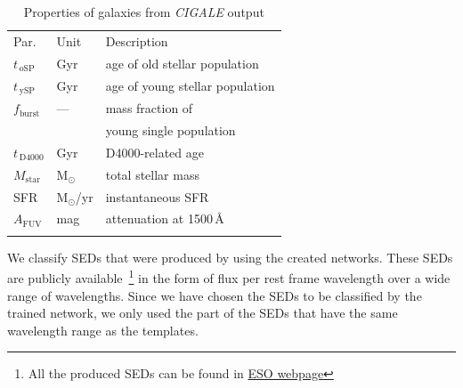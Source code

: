        
    \begin{table}
\caption{Properties of  galaxies from {\em CIGALE} output }     %
\label{tab: props}
\centering
\begin{tabular}{l l l}
\hline\hline
\noalign{\smallskip}
Par. & Unit & Description\\
\noalign{\smallskip}
\hline
\noalign{\smallskip}
$t_{\,\mathrm{oSP}}$ & Gyr & age of old stellar population \\
$t_{\,\mathrm{ySP}}$ & Gyr & age of young stellar population \\
$f_\mathrm{burst}$ & --- & mass fraction of \\
& & young single population  \\
\noalign{\smallskip}
$t_{\,\mathrm{D4000}}$ & Gyr & D4000-related age \\
\noalign{\smallskip}
$M_\mathrm{star}$ & M$_\odot$ & total stellar mass  \\
SFR & M$_\odot$/yr & instantaneous SFR  \\
$A_\mathrm{FUV}$ & mag & attenuation at 1500\,\AA{} \\
\noalign{\smallskip}
\hline
\end{tabular}
\end{table}
    
    We classify SEDs that were produced by  using the created networks.
    These SEDs are publicly available~\footnote{All the  produced SEDs can be found in \href{http://telbib.eso.org/detail.php?bibcode=2012AJ....144..172T}{ESO webpage}} in the form of flux per rest frame wavelength over a wide range of wavelengths.
    Since we have chosen the  SEDs to be classified by the trained network, we only used the part of the SEDs that have the same wavelength range as the  templates. 
